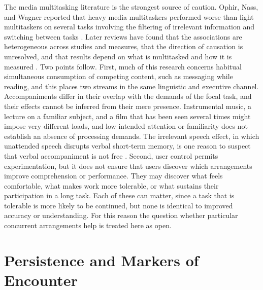 \documentclass[12pt]{article}
\begin{document}
The media multitasking literature is the strongest source of caution. Ophir, Nass, and Wagner reported that heavy media multitaskers performed worse than light multitaskers on several tasks involving the filtering of irrelevant information and switching between tasks \cite{ophir2009cognitive}. Later reviews have found that the associations are heterogeneous across studies and measures, that the direction of causation is unresolved, and that results depend on what is multitasked and how it is measured \cite{uncapher2018minds, vanderschuur2015consequences}. Two points follow. First, much of this research concerns habitual simultaneous consumption of competing content, such as messaging while reading, and this places two streams in the same linguistic and executive channel. Accompaniments differ in their overlap with the demands of the focal task, and their effects cannot be inferred from their mere presence. Instrumental music, a lecture on a familiar subject, and a film that has been seen several times might impose very different loads, and low intended attention or familiarity does not establish an absence of processing demands. The irrelevant speech effect, in which unattended speech disrupts verbal short-term memory, is one reason to suspect that verbal accompaniment is not free \cite{salame1982disruption}. Second, user control permits experimentation, but it does not ensure that users discover which arrangements improve comprehension or performance. They may discover what feels comfortable, what makes work more tolerable, or what sustains their participation in a long task. Each of these can matter, since a task that is tolerable is more likely to be continued, but none is identical to improved accuracy or understanding. For this reason the question whether particular concurrent arrangements help is treated here as open.

\section{Persistence and Markers of Encounter}
\end{document}
